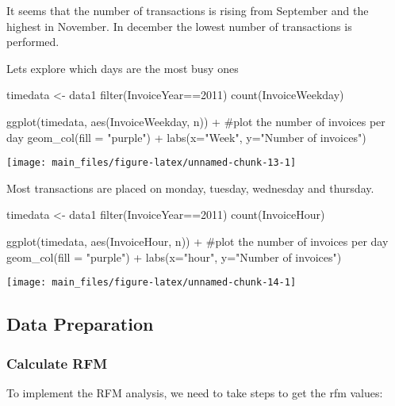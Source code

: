 It seems that the number of transactions is rising from September and
the highest in November. In december the lowest number of transactions
is performed.

Lets explore which days are the most busy ones

\begin{Schunk}
\begin{Sinput}
timedata <- data1 %>% 
  filter(InvoiceYear==2011) %>% 
  count(InvoiceWeekday)

ggplot(timedata, aes(InvoiceWeekday, n)) +  #plot the number of invoices per day               
    geom_col(fill = "purple") +
  labs(x="Week", y="Number of invoices") 
\end{Sinput}


\begin{center}\texttt{[image: main\_files/figure-latex/unnamed-chunk-13-1]} \end{center}

\end{Schunk}

Most transactions are placed on monday, tuesday, wednesday and thursday.

\begin{Schunk}
\begin{Sinput}
timedata <- data1 %>% 
 filter(InvoiceYear==2011) %>% 
  count(InvoiceHour)

ggplot(timedata, aes(InvoiceHour, n)) +  #plot the number of invoices per day               
    geom_col(fill = "purple") +
  labs(x="hour", y="Number of invoices") 
\end{Sinput}


\begin{center}\texttt{[image: main\_files/figure-latex/unnamed-chunk-14-1]} \end{center}

\end{Schunk}

\hypertarget{data-preparation}{%
\subsection{Data Preparation}\label{data-preparation}}

\hypertarget{calculate-rfm}{%
\subsubsection{Calculate RFM}\label{calculate-rfm}}

To implement the RFM analysis, we need to take steps to get the rfm
values:

